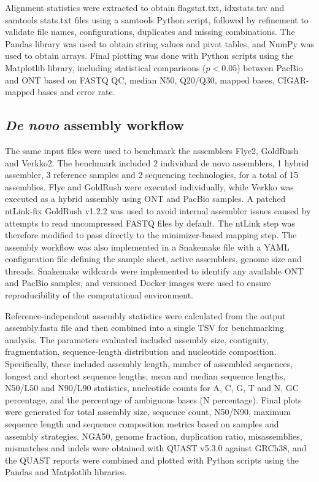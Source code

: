 \documentclass[12pt, letterpaper]{article}
\begin{document}
Alignment statistics were extracted to obtain flagstat.txt, idxstats.tsv and samtools stats.txt files using a samtools Python script, followed by refinement to validate file names, configurations, duplicates and missing combinations. The Pandas library was used to obtain string values and pivot tables, and NumPy was used to obtain arrays. Final plotting was done with Python scripts using the Matplotlib library, including statistical comparisons ($p<0.05$) between PacBio and ONT based on FASTQ QC, median N50, Q20/Q30, mapped bases, CIGAR-mapped bases and error rate.

\subsection{\textit{De novo} assembly workflow}

The same input files were used to benchmark the assemblers Flye2, GoldRush and Verkko2. The benchmark included 2 individual de novo assemblers, 1 hybrid assembler, 3 reference samples and 2 sequencing technologies, for a total of 15 assemblies. Flye and GoldRush were executed individually, while Verkko was executed as a hybrid assembly using ONT and PacBio samples. A patched ntLink-fix GoldRush v1.2.2 was used to avoid internal assembler issues caused by attempts to read uncompressed FASTQ files by default. The ntLink step was therefore modified to pass directly to the minimizer-based mapping step. The assembly workflow was also implemented in a Snakemake file with a YAML configuration file defining the sample sheet, active assemblers, genome size and threads. Snakemake wildcards were implemented to identify any available ONT and PacBio samples, and versioned Docker images were used to ensure reproducibility of the computational environment.

Reference-independent assembly statistics were calculated from the output assembly.fasta file and then combined into a single TSV for benchmarking analysis. The parameters evaluated included assembly size, contiguity, fragmentation, sequence-length distribution and nucleotide composition. Specifically, these included assembly length, number of assembled sequences, longest and shortest sequence lengths, mean and median sequence lengths, N50/L50 and N90/L90 statistics, nucleotide counts for A, C, G, T and N, GC percentage, and the percentage of ambiguous bases (N percentage). Final plots were generated for total assembly size, sequence count, N50/N90, maximum sequence length and sequence composition metrics based on samples and assembly strategies. NGA50, genome fraction, duplication ratio, misassemblies, mismatches and indels were obtained with QUAST v5.3.0 against GRCh38, and the QUAST reports were combined and plotted with Python scripts using the Pandas and Matplotlib libraries.
\end{document}
